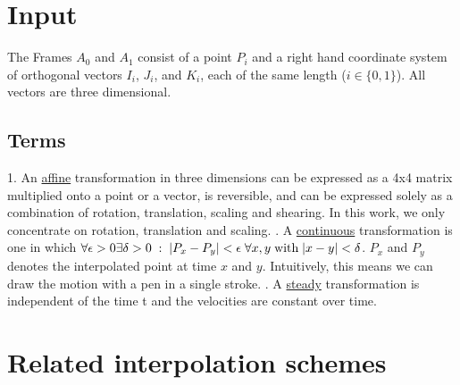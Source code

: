 \documentclass[journal, letterpaper]{IEEEtran}
\begin{document}
\section{Input}
The Frames $A_0$ and $A_1$ consist of a point $P_i$ and a right hand coordinate system of orthogonal vectors $I_i$, $J_i$, and $K_i$, each of the same length ($i \in \{0,1\}$). All vectors are three dimensional.
\subsection{Terms} 
1. An \underline{affine} transformation in three dimensions can be expressed as a 4x4 matrix multiplied onto a point or a vector, is reversible, and can be expressed solely as a combination of rotation, translation, scaling and shearing. In this work, we only concentrate on rotation, translation and scaling.
. A \underline{continuous} transformation is one in which $\forall \epsilon>0 \\ \exists \delta>0 \; : \; |P_x - P_y|<\epsilon \; \forall x,y \; \text{with} \; |x-y|<\delta$. $P_x$ and $P_y$ denotes the interpolated point at time $x$ and $y$. Intuitively, this means we can draw the motion with a pen in a single stroke.
. A \underline{steady} transformation is independent of the time t and the velocities are constant over time. 

\section{Related interpolation schemes}
\end{document}
